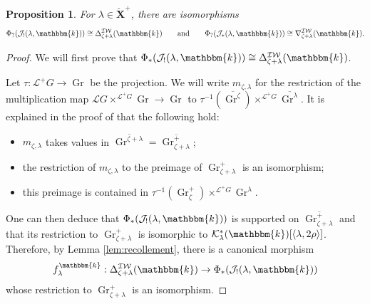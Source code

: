 \documentclass{amsart}
\renewcommand{\L}{\mathcal{L}}
\renewcommand{\k}{\mathbbm{k}}
\newcommand{\scrJ}{\mathcal{J}}
\newcommand{\scrK}{\mathcal{K}}
\newcommand{\bfXv}{\check{\mathbf{X}}}
\newcommand{\IW}{\mathcal{IW}}
\DeclareMathOperator{\Gr}{Gr}
\newtheorem{proposition}[subsubsection]{Proposition}
\theoremstyle{definition}
\begin{document}
    \begin{proposition}\label{prop:phi_on_std_costds}
        For $\lambda \in \bfXv^+$, there are isomorphisms
        \[\Phi_? (\scrJ_! (\lambda, \k)) \cong \Delta_{\zeta + \lambda}^{\IW} (\k) \qquad\text{and}\qquad \Phi_? (\scrJ_* (\lambda, \k)) \cong \nabla_{\zeta + \lambda}^{\IW} (\k).\]
    \end{proposition}
    \begin{proof}
        We will first prove that $\Phi_* (\scrJ_! (\lambda, \k)) \cong \Delta_{\zeta + \lambda}^{\IW} (\k)$. 
        
        Let $\tau : \L^+ G \to \Gr$ be the projection.
        We will write $m_{\zeta, \lambda}$ for the restriction of the multiplication map $\L G \times^{\L^+ G} \Gr \to \Gr$ to $\tau^{-1} (\overline{\Gr^{\zeta}}) \times^{\L^+ G} \overline{\Gr^{\lambda}}$.
        It is explained in the proof of \cite[Theorem 3.9]{BGMRR} that the following hold:
        \begin{itemize}
            \item $m_{\zeta, \lambda}$ takes values in $\overline{\Gr^{\zeta + \lambda}} = \overline{\Gr_{\zeta + \lambda}^+}$;
            \item the restriction of $m_{\zeta, \lambda}$ to the preimage of $\Gr_{\zeta + \lambda}^+$ is an isomorphism;
            \item this preimage is contained in $\tau^{-1} (\Gr_{\zeta}^+) \times^{\L^+ G} \Gr^{\lambda}$.
        \end{itemize}
        One can then deduce that $\Phi_* (\scrJ_! (\lambda, \k))$ is supported on $\overline{\Gr_{\zeta + \lambda}^+}$ and that its restriction to $\Gr_{\zeta + \lambda}^+$ is isomorphic to $\scrK_{\lambda}^* (\k) [\langle \lambda, 2\rho \rangle]$.
        Therefore, by Lemma \ref{lem:recollement}, there is a canonical morphism
        \[f_{\lambda}^{\k} : \Delta_{\zeta + \lambda}^{\IW} (\k) \to \Phi_* (\scrJ_! (\lambda, \k))\]
        whose restriction to $\Gr_{\zeta + \lambda}^+$ is an isomorphism.


\end{proof}
\end{document}
